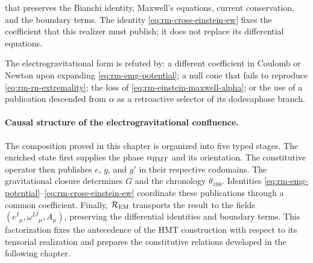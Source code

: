 that preserves the Bianchi identity, Maxwell's equations,
current conservation, and the boundary terms. The identity
\eqref{eq:rm-cross-einstein-ew} fixes the coefficient that this realizer must
publish; it does not replace its differential equations.

\begin{falsifierbox}
The electrogravitational form is refuted by: a different coefficient in Coulomb or
Newton upon expanding \eqref{eq:rm-emg-potential}; a null cone that fails to reproduce
\eqref{eq:rm-rn-extremality}; the loss of
\eqref{eq:rm-einstein-maxwell-alpha}; or the use of a publication
descended from \(\alpha\) as a retroactive selector of its dodecaphase branch.
\end{falsifierbox}

\paragraph{Causal structure of the electrogravitational confluence.}
The composition proved in this chapter is organized into five typed stages. The enriched state first supplies the phase \(\alpha_{\rm HMT}\) and its orientation. The constitutive operator then publishes \(e\), \(g\), and \(g'\) in their respective codomains. The gravitational closure determines \(G\) and the chronology \(\theta_{108}\). Identities \eqref{eq:rm-emg-potential}--\eqref{eq:rm-cross-einstein-ew} coordinate these publications through a common coefficient. Finally, \(\mathcal R_{\rm EM}\) transports the result to the fields \((e^I{}_{\mu},\omega^{IJ}{}_{\mu},A_\mu)\), preserving the differential identities and boundary terms. This factorization fixes the antecedence of the HMT construction with respect to its tensorial realization and prepares the constitutive relations developed in the following chapter.
